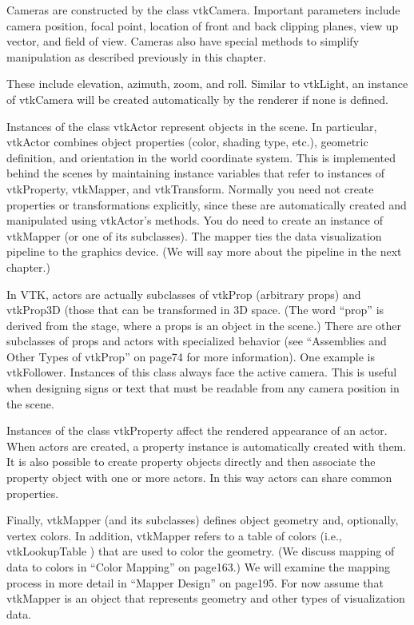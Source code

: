 Cameras are constructed by the class vtkCamera. Important parameters include camera position, focal point, location of front and back clipping planes, view up vector, and field of view. Cameras also have special methods to simplify manipulation as described previously in this chapter.

These include elevation, azimuth, zoom, and roll. Similar to vtkLight, an instance of vtkCamera will be created automatically by the renderer if none is defined.

Instances of the class vtkActor represent objects in the scene. In particular, vtkActor combines object properties (color, shading type, etc.), geometric definition, and orientation in the world coordinate system. This is implemented behind the scenes by maintaining instance variables that refer to instances of vtkProperty, vtkMapper, and vtkTransform. Normally you need not create properties or transformations explicitly, since these are automatically created and manipulated using vtkActor's methods. You do need to create an instance of vtkMapper (or one of its subclasses). The mapper ties the data visualization pipeline to the graphics device. (We will say more about the pipeline in the next chapter.)

 In VTK, actors are actually subclasses of vtkProp (arbitrary props) and vtkProp3D (those that can be transformed in 3D space. (The word “prop” is derived from the stage, where a props is an object in the scene.) There are other subclasses of props and actors with specialized behavior (see ``Assemblies and Other Types of vtkProp'' on page74 for more information). One example is vtkFollower. Instances of this class always face the active camera. This is useful when designing signs or text that must be readable from any camera position in the scene.

Instances of the class vtkProperty affect the rendered appearance of an actor. When actors are created, a property instance is automatically created with them. It is also possible to create property objects directly and then associate the property object with one or more actors. In this way actors can share common properties.

Finally, vtkMapper (and its subclasses) defines object geometry and, optionally, vertex colors. In addition, vtkMapper refers to a table of colors (i.e., vtkLookupTable ) that are used to color the geometry. (We discuss mapping of data to colors in ``Color Mapping'' on page163.) We will examine the mapping process in more detail in ``Mapper Design'' on page195. For now assume that vtkMapper is an object that represents geometry and other types of visualization data.

